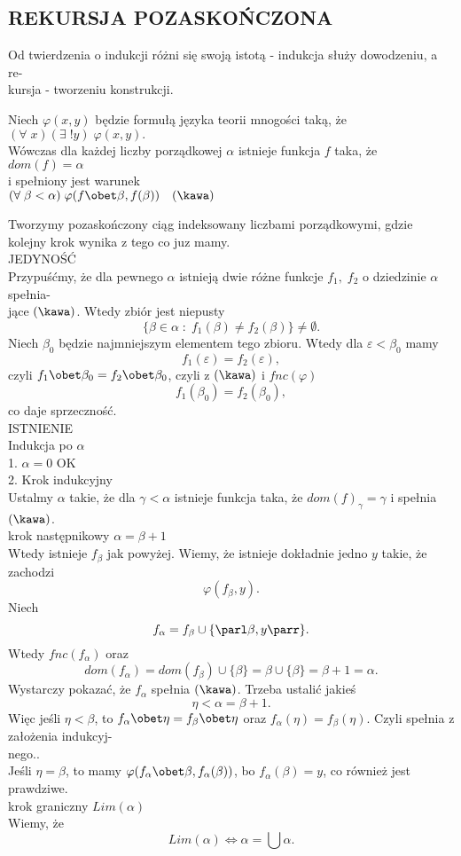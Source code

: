 \subsection{REKURSJA POZASKOŃCZONA}
Od twierdzenia o indukcji różni się swoją istotą - indukcja służy dowodzeniu, a re-\\kursja - tworzeniu konstrukcji.\bigskip
\begin{center}\large
    Niech $\varphi(x,y)$ będzie formułą języka teorii mnogości taką, że\smallskip\\
    $(\forall\;x)(\exists\;!y)\;\varphi(x,y).$\smallskip\\
    Wówczas dla każdej liczby porządkowej $\alpha$ istnieje funkcja $f$ taka, że\smallskip\\
    $dom(f)=\alpha$\smallskip\\
    i spełniony jest warunek\smallskip\\
    $(\forall\;\beta<\alpha)\;\varphi(f\obet\beta, f(\beta))\quad(\kawa)$
\end{center}
Tworzymy pozaskończony ciąg indeksowany liczbami porządkowymi, gdzie kolejny krok wynika z tego co juz mamy.\bigskip\\
\dowod
{\large\color{def}JEDYNOŚĆ}\medskip\\
Przypuśćmy, że dla pewnego $\alpha$ istnieją dwie różne funkcje $f_1,\;f_2$ o dziedzinie $\alpha$ spełnia-\\jące $(\kawa)$. Wtedy zbiór jest niepusty
$$\{\beta\in\alpha\;:\;f_1(\beta)\neq f_2(\beta)\}\neq\emptyset.$$
Niech $\beta_0$ będzie najmniejszym elementem tego zbioru. Wtedy dla $\varepsilon<\beta_0$ mamy
$$f_1(\varepsilon)=f_2(\varepsilon),$$
czyli $f_1\obet\beta_0=f_2\obet\beta_0$, czyli z $(\kawa)$ i $fnc(\varphi)$
$$f_1(\beta_0)=f_2(\beta_0),$$
co daje sprzeczność.\bigskip\\
{\large\color{def}ISTNIENIE}\medskip\\
Indukcja po $\alpha$\medskip\\
1. $\alpha=0$ OK\medskip\\
2. Krok indukcyjny\smallskip\\
Ustalmy $\alpha$ takie, że dla $\gamma<\alpha$ istnieje funkcja taka, że $dom(f)_\gamma=\gamma$ i spełnia $(\kawa)$.\smallskip\\
\indent krok następnikowy $\alpha=\beta+1$\smallskip\\
Wtedy istnieje $f_\beta$ jak powyżej. Wiemy, że istnieje dokładnie jedno $y$ takie, że zachodzi
$$\varphi(f_\beta, y).$$
Niech 
$$f_\alpha=f_\beta\cup\{\parl\beta, y\parr\}.$$
Wtedy $fnc(f_\alpha)$ oraz 
$$dom(f_\alpha)=dom(f_\beta)\cup\{\beta\}=\beta\cup\{\beta\}=\beta+1=\alpha.$$
Wystarczy pokazać, że $f_\alpha$ spełnia $(\kawa)$. Trzeba ustalić jakieś 
$$\eta<\alpha=\beta+1.$$
Więc jeśli $\eta<\beta$, to $f_\alpha\obet\eta=f_\beta\obet\eta$ oraz $f_\alpha(\eta)=f_\beta(\eta)$. Czyli spełnia z założenia indukcyj-\\nego.. \\
Jeśli $\eta=\beta$, to mamy $\varphi(f_\alpha\obet\beta, f_\alpha(\beta))$, bo $f_\alpha(\beta)=y$, co również jest prawdziwe.\medskip\\
\indent krok graniczny $Lim(\alpha)$\smallskip\\
Wiemy, że
$$Lim(\alpha)\iff \alpha=\bigcup \alpha.$$
